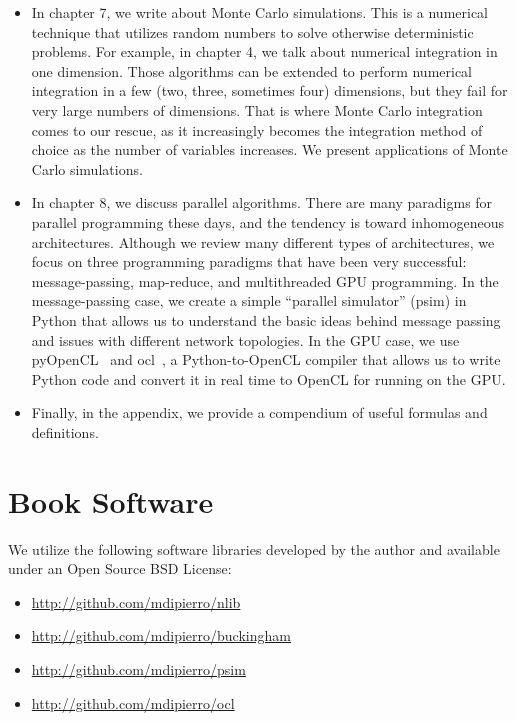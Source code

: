 \documentclass[justified,sixbynine]{tufte-book}
\theoremstyle{plain}%
\theoremstyle{definition}
\theoremstyle{remark}
\begin{document}
\begin{fullwidth}
\begin{itemize}
\item In chapter 7, we write about Monte Carlo simulations. This is a numerical technique that utilizes random numbers to solve otherwise deterministic problems. For example, in chapter 4, we talk about numerical integration in one dimension. Those algorithms can be extended to perform numerical integration in a few (two, three, sometimes four) dimensions, but they fail for very large numbers of dimensions. That is where Monte Carlo integration comes to our rescue, as it increasingly becomes the integration method of choice as the number of variables increases. We present applications of Monte Carlo simulations.
\item In chapter 8, we discuss parallel algorithms. There are many paradigms for parallel programming these days, and the tendency is toward inhomogeneous architectures. Although we review many different types of architectures, we focus on three programming paradigms that have been very successful: message-passing, map-reduce, and multithreaded GPU programming. In the message-passing case, we create a simple ``parallel simulator'' (psim) in Python that allows us to understand the basic ideas behind message passing and issues with different network topologies. In the GPU case, we use pyOpenCL~\cite{pyopencl} and ocl~\cite{ocl}, a Python-to-OpenCL compiler that allows us to write Python code and convert it in real time to OpenCL for running on the GPU.

\item Finally, in the appendix, we provide a compendium of useful formulas and definitions.
\end{itemize}

\section{Book Software}

We utilize the following software libraries developed by the author and available under an Open Source BSD License:

\begin{itemize}
\item \url{http://github.com/mdipierro/nlib}
\item \url{http://github.com/mdipierro/buckingham}
\item \url{http://github.com/mdipierro/psim}
\item \url{http://github.com/mdipierro/ocl}
\end{itemize}


\end{fullwidth}
\end{document}
